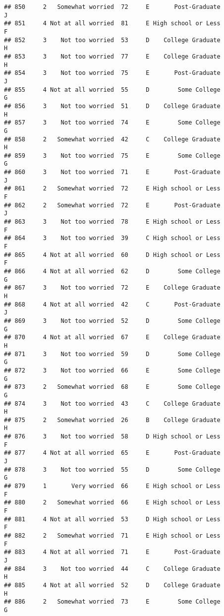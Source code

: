 \documentclass[
]{article}
\begin{document}
\begin{verbatim}
## 850     2   Somewhat worried  72     E       Post-Graduate         J
## 851     4 Not at all worried  81     E High school or Less         F
## 852     3    Not too worried  53     D    College Graduate         H
## 853     3    Not too worried  77     E    College Graduate         H
## 854     3    Not too worried  75     E       Post-Graduate         J
## 855     4 Not at all worried  55     D        Some College         G
## 856     3    Not too worried  51     D    College Graduate         H
## 857     3    Not too worried  74     E        Some College         G
## 858     2   Somewhat worried  42     C    College Graduate         H
## 859     3    Not too worried  75     E        Some College         G
## 860     3    Not too worried  71     E       Post-Graduate         J
## 861     2   Somewhat worried  72     E High school or Less         F
## 862     2   Somewhat worried  72     E       Post-Graduate         J
## 863     3    Not too worried  78     E High school or Less         F
## 864     3    Not too worried  39     C High school or Less         F
## 865     4 Not at all worried  60     D High school or Less         F
## 866     4 Not at all worried  62     D        Some College         G
## 867     3    Not too worried  72     E    College Graduate         H
## 868     4 Not at all worried  42     C       Post-Graduate         J
## 869     3    Not too worried  52     D        Some College         G
## 870     4 Not at all worried  67     E    College Graduate         H
## 871     3    Not too worried  59     D        Some College         G
## 872     3    Not too worried  66     E        Some College         G
## 873     2   Somewhat worried  68     E        Some College         G
## 874     3    Not too worried  43     C    College Graduate         H
## 875     2   Somewhat worried  26     B    College Graduate         H
## 876     3    Not too worried  58     D High school or Less         F
## 877     4 Not at all worried  65     E       Post-Graduate         J
## 878     3    Not too worried  55     D        Some College         G
## 879     1       Very worried  66     E High school or Less         F
## 880     2   Somewhat worried  66     E High school or Less         F
## 881     4 Not at all worried  53     D High school or Less         F
## 882     2   Somewhat worried  71     E High school or Less         F
## 883     4 Not at all worried  71     E       Post-Graduate         J
## 884     3    Not too worried  44     C    College Graduate         H
## 885     4 Not at all worried  52     D    College Graduate         H
## 886     2   Somewhat worried  73     E        Some College         G

\end{verbatim}
\end{document}
